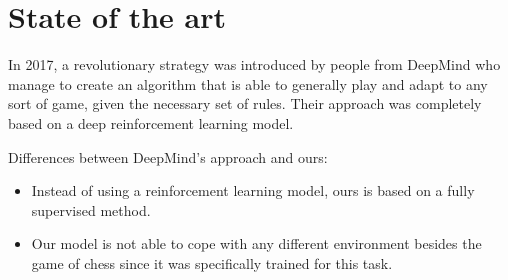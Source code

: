 \documentclass[runningheads,a4paper,11pt]{report}
\begin{document}
\chapter{State of the art}
\label{chapter:stateOfArt}


In 2017, a revolutionary strategy was introduced by people from DeepMind who manage to create an algorithm that is able to generally play and adapt to any sort of game, given the necessary set of rules. Their approach was completely based on a deep reinforcement learning model.

Differences between DeepMind's approach and ours:
\begin{itemize}
	 \item Instead of using a reinforcement learning model, ours is based on a fully supervised method.
	 \item Our model is not able to cope with any different environment besides the game of chess since it was specifically trained for this task. 
\end{itemize}
\end{document}
